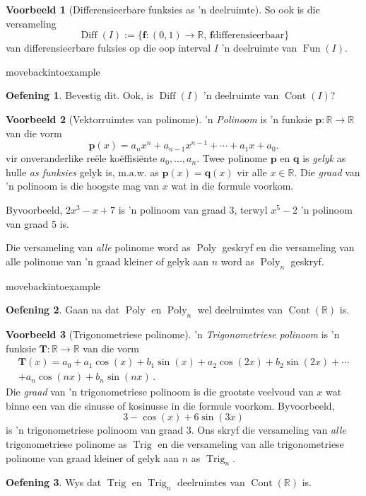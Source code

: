 \documentclass[a4paper,11pt]{book}
\theoremstyle{definition}
\newtheorem{exercise}{Oefening}
\newtheorem{example_environment}{Voorbeeld}[chapter]
\newcommand{\be}{\begin{equation}}
\newcommand{\ee}{\end{equation}}
\newcommand{\ve}[1]{\mathbf{#1}}
\newenvironment{example}
	{
		\begin{oframed}
		\begin{example_environment}
	}
	{
		\end{example_environment}
		\end{oframed}
	}
\DeclareMathOperator{\Fun}{Fun}
\DeclareMathOperator{\Cont}{Cont}
\DeclareMathOperator{\Diff}{Diff}
\DeclareMathOperator{\Poly}{Poly}
\DeclareMathOperator{\Trig}{Trig}
\begin{document}
\begin{example}[Differensieerbare funksies as 'n deelruimte] So ook is die
	versameling
	\[
		\Diff(I) := \{ \ve{f}: (0,1) \rightarrow \mathbb{R}, \, \ve{f}
		\mbox{differensieerbaar} \}
	\]
	van differensieerbare fuksies op die oop interval $I$ 'n deelruimte van
	$\Fun (I)$.

\end{example}movebackintoexample
	\begin{exercise}
	Bevestig dit. Ook, is $\Diff( I)$ 'n deelruimte van $\Cont(I)$?
\end{exercise}
\begin{example}[Vektorruimtes van polinome] 
	'n \emph{Polinoom} is 'n funksie $\ve{p} : \mathbb{R}
	\rightarrow \mathbb{R}$ van die vorm
	\be
	\ve{p}(x) = a_n x^n + a_{n-1}x^{n-1} + \cdots + a_1 x + a_0.
	\label{formula_poly}
	\ee
	vir onveranderlike re{\"e}le ko{\"e}ffisi{\"e}nte $a_0, \ldots, a_n$.
	Twee polinome $\ve{p}$ en $\ve{q}$ is \emph{gelyk} as hulle \emph{as
	funksies} gelyk is, m.a.w. as $\ve{p}(x) = \ve{q} (x)$ vir alle $x \in
	\mathbb{R}$. Die \emph{graad} van 'n polinoom is die hoogste mag van
	$x$ wat in die formule voorkom.

	Byvoorbeeld, $2x^3 - x + 7$ is 'n polinoom van graad 3, terwyl $x^5 -
	2$ 'n polinoom van graad 5 is.
	
	Die versameling van \emph{alle} polinome word as $\Poly$
	geskryf en die versameling van alle polinome van 'n graad kleiner of
	gelyk aan $n$ word as $\Poly_n$ geskryf.


\end{example}movebackintoexample
	\begin{exercise}
	Gaan na dat $\Poly$ en $\Poly_n$ wel deelruimtes van $\Cont
	(\mathbb{R})$ is.
\end{exercise}
\begin{example}[Trigonometriese polinome] \label{trig_poly_example} 'n
	\emph{Trigonometriese polinoom} is 'n funksie $\ve{T} : \mathbb{R}
	\rightarrow \mathbb{R}$ van die vorm
	\begin{multline} \label{formula_for_trig_poly}
		\ve{T} (x) = a_0 + a_1 \cos(x) + b_1 \sin(x) + a_2 \cos(2x) + b_2
		\sin(2x) + \cdots \\ + a_n \cos(nx) + b_n \sin(nx) \, .
	\end{multline}
	Die \emph{graad} van 'n trigonometriese polinoom is die grootste
	veelvoud van $x$ wat binne een van die sinusse of kosinusse in die
	formule voorkom.  Byvoorbeeld,
	\[
		3 - \cos(x) + 6 \sin(3x)
	\]
	is 'n trigonometriese polinoom van graad 3. Ons skryf die versameling
	van \emph{alle} trigonometriese polinome as $\Trig$ en die versameling
	van alle trigonometriese polinome van graad kleiner of gelyk aan $n$ as
	$\Trig_n$.


\end{example}
	\begin{exercise}
	Wys dat $\Trig$ en $\Trig_n$ deelruimtes van $\Cont (\mathbb{R})$
	is.
\end{exercise}
\end{document}
